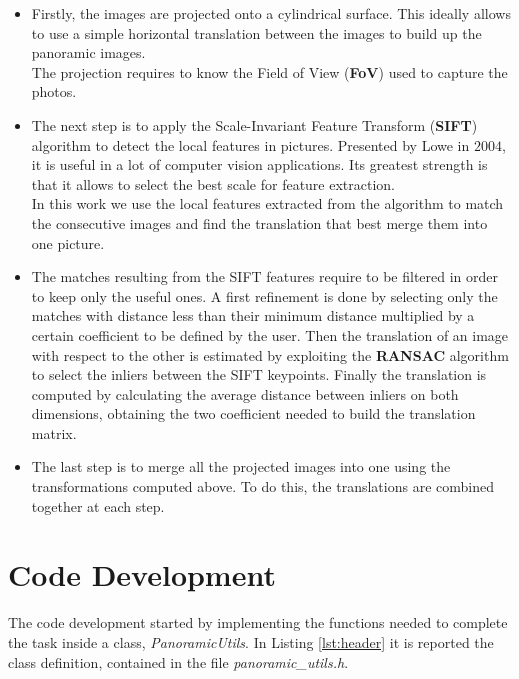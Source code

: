 \documentclass[11pt,a4paper]{article}
\begin{document}
\begin{itemize}
	\item Firstly, the images are projected onto a cylindrical surface. This ideally allows to use a simple horizontal translation between the images to build up the panoramic images.  \\
	The projection requires to know the Field of View (\textbf{FoV}) used to capture the photos.
	
	\item The next step is to apply the Scale-Invariant Feature Transform (\textbf{SIFT}) algorithm to detect the local features in pictures. 
	Presented by Lowe in $2004$, it is useful in a lot of computer vision applications. Its greatest strength is that it allows to select the best scale for feature extraction. \\	
	In this work we use the local features extracted from the algorithm to match the consecutive images and find the translation that best merge them into one picture.
	
	\item The matches resulting from the SIFT features require to be filtered in order to keep only the useful ones. 
	A first refinement is done by selecting only the matches with distance less than their minimum distance multiplied by a certain coefficient to be defined by the user.
	Then the translation of an image with respect to the other is estimated by exploiting the \textbf{RANSAC} algorithm to select the inliers between the SIFT keypoints. Finally the translation is computed by calculating the average distance between inliers on both dimensions, obtaining the two coefficient needed to build the translation matrix.
	
	\item The last step is to merge all the projected images into one using the transformations computed above. To do this, the translations are combined together at each step.	
\end{itemize}

\section{Code Development} %

The code development started by implementing the functions needed to complete the task inside a class, \textit{PanoramicUtils}. In Listing \ref{lst:header} it is reported the class definition, contained in the file \textit{panoramic\_utils.h}. 
\end{document}
